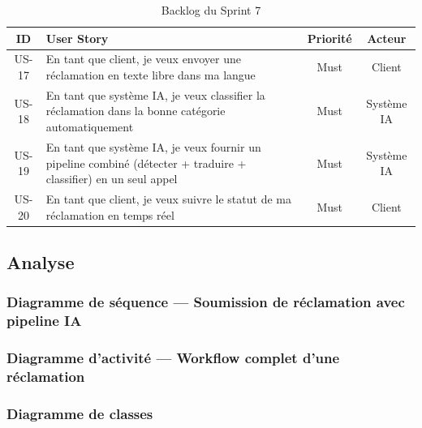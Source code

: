 \begin{table}[H]
\centering
\caption{Backlog du Sprint 7}
\label{tab:backlog_sprint7}
\begin{tabular}{|c|p{8.5cm}|c|c|}
\hline
\textbf{ID} & \textbf{User Story} & \textbf{Priorité} & \textbf{Acteur} \\
\hline
US-17 & En tant que client, je veux envoyer une réclamation en texte libre dans ma langue & Must & Client \\
\hline
US-18 & En tant que système IA, je veux classifier la réclamation dans la bonne catégorie automatiquement & Must & Système IA \\
\hline
US-19 & En tant que système IA, je veux fournir un pipeline combiné (détecter + traduire + classifier) en un seul appel & Must & Système IA \\
\hline
US-20 & En tant que client, je veux suivre le statut de ma réclamation en temps réel & Must & Client \\
\hline
\end{tabular}
\end{table}

\subsection{Analyse}

\subsubsection{Diagramme de séquence — Soumission de réclamation avec pipeline IA}


\subsubsection{Diagramme d'activité — Workflow complet d'une réclamation}


\subsubsection{Diagramme de classes}


